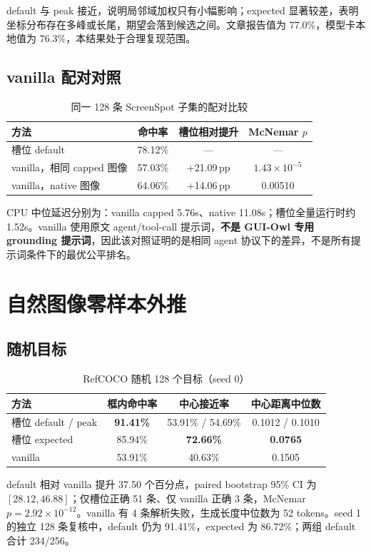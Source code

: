 \documentclass[UTF8,a4paper,11pt,fontset=none]{ctexart}
\newcommand{\pp}{\ensuremath{\,\mathrm{pp}}}
\begin{document}
default 与 peak 接近，说明局邻域加权只有小幅影响；expected 显著较差，表明坐标分布存在多峰或长尾，期望会落到候选之间。文章报告值为 77.0\%，模型卡本地值为 76.3\%，本结果处于合理复现范围。

\subsection{vanilla 配对对照}
\begin{table}[H]
\centering\small
\caption{同一 128 条 ScreenSpot 子集的配对比较}
\begin{tabular}{lccc}
\toprule
方法 & 命中率 & 槽位相对提升 & McNemar $p$ \\
\midrule
槽位 default & 78.12\% & --- & --- \\
vanilla，相同 capped 图像 & 57.03\% & +21.09\pp & $1.43\times10^{-5}$ \\
vanilla，native 图像 & 64.06\% & +14.06\pp & 0.00510 \\
\bottomrule
\end{tabular}
\end{table}

CPU 中位延迟分别为：vanilla capped 5.76s、native 11.08s；槽位全量运行时约 1.52s。vanilla 使用原文 agent/tool-call 提示词，\textbf{不是 GUI-Owl 专用 grounding 提示词}，因此该对照证明的是相同 agent 协议下的差异，不是所有提示词条件下的最优公平排名。

\section{自然图像零样本外推}
\subsection{随机目标}
\begin{table}[H]
\centering\small
\caption{RefCOCO 随机 128 个目标（seed 0）}
\begin{tabular}{lccc}
\toprule
方法 & 框内命中率 & 中心接近率 & 中心距离中位数 \\
\midrule
槽位 default / peak & \textbf{91.41\%} & 53.91\% / 54.69\% & 0.1012 / 0.1010 \\
槽位 expected & 85.94\% & \textbf{72.66\%} & \textbf{0.0765} \\
vanilla & 53.91\% & 40.63\% & 0.1505 \\
\bottomrule
\end{tabular}
\end{table}

default 相对 vanilla 提升 37.50 个百分点，paired bootstrap 95\% CI 为 $[28.12,46.88]$；仅槽位正确 51 条、仅 vanilla 正确 3 条，McNemar $p=2.92\times10^{-12}$。vanilla 有 4 条解析失败，生成长度中位数为 52 tokens。seed 1 的独立 128 条复核中，default 仍为 91.41\%，expected 为 86.72\%；两组 default 合计 234/256。
\end{document}
